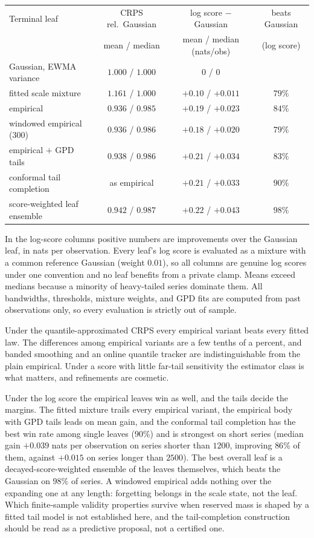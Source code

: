 \documentclass[11pt]{article}
\theoremstyle{remark}
\begin{document}
\begin{center}
\small
\begin{tabular}{lccc}
\toprule
Terminal leaf & CRPS rel.\ Gaussian & log score $-$ Gaussian & beats Gaussian\\
 & mean / median & mean / median (nats/obs) & (log score)\\
\midrule
Gaussian, EWMA variance & $1.000$ / $1.000$ & $0$ / $0$ & \\
fitted scale mixture & $1.161$ / $1.000$ & $+0.10$ / $+0.011$ & $79\%$\\
empirical & $0.936$ / $0.985$ & $+0.19$ / $+0.023$ & $84\%$\\
windowed empirical (300) & $0.936$ / $0.986$ & $+0.18$ / $+0.020$ & $79\%$\\
empirical $+$ GPD tails & $0.938$ / $0.986$ & $+0.21$ / $+0.034$ & $83\%$\\
conformal tail completion & as empirical & $+0.21$ / $+0.033$ & $90\%$\\
score-weighted leaf ensemble & $0.942$ / $0.987$ & $+0.22$ / $+0.043$ & $98\%$\\
\bottomrule
\end{tabular}
\end{center}

In the log-score columns positive numbers are improvements over the Gaussian leaf, in nats
per observation. Every leaf's log score is evaluated as a mixture with a common reference
Gaussian (weight $0.01$), so all columns are genuine log scores under one convention and no
leaf benefits from a private clamp. Means exceed medians because a minority of heavy-tailed
series dominate them. All bandwidths, thresholds, mixture weights, and GPD
fits are computed from past observations only, so every evaluation is strictly out of sample.

Under the quantile-approximated CRPS every empirical variant beats every fitted law. The
differences among empirical variants are a few tenths of a percent, and banded smoothing and
an online quantile tracker are indistinguishable from the plain empirical. Under a score with
little far-tail sensitivity the estimator class is what matters, and refinements are
cosmetic.

Under the log score the empirical leaves win as well, and the tails decide the margins. The
fitted mixture trails every empirical variant, the empirical body with GPD tails leads on
mean gain, and the conformal tail completion has the best win rate among single leaves
($90\%$) and is strongest on short series (median gain $+0.039$ nats per observation on
series shorter than $1200$, improving $86\%$ of them, against $+0.015$ on series longer than
$2500$). The best overall leaf is a decayed-score-weighted ensemble of the leaves themselves,
which beats the Gaussian on $98\%$ of series. A windowed empirical adds nothing over the
expanding one at any length: forgetting belongs in the scale state, not the leaf. Which finite-sample
validity properties survive when reserved mass is shaped by a fitted tail model is not
established here, and the tail-completion construction should be read as a predictive
proposal, not a certified one.
\end{document}
